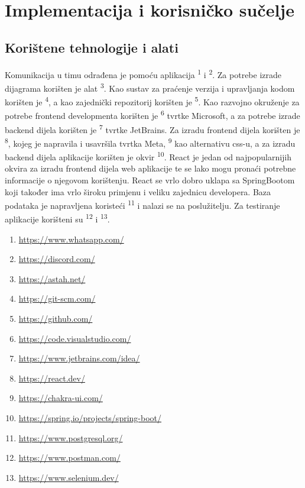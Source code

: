 \chapter{Implementacija i korisničko sučelje}


\section{Korištene tehnologije i alati}

Komunikacija u timu odrađena je pomoću aplikacija \textsuperscript{1} i \textsuperscript{2}. Za potrebe izrade dijagrama korišten je alat \textsuperscript{3}. Kao sustav za praćenje verzija i upravljanja kodom korišten je \textsuperscript{4}, a kao zajednički repozitorij korišten je \textsuperscript{5}.
Kao razvojno okruženje za potrebe frontend developmenta korišten je \textsuperscript{6} tvrtke Microsoft, a za potrebe izrade backend dijela korišten je \textsuperscript{7} tvrtke JetBrains. \newline
Za izradu frontend dijela korišten je \textsuperscript{8}, kojeg je napravila i usavršila tvrtka Meta, \textsuperscript{9} kao alternativu css-u, a za izradu backend dijela aplikacije korišten je okvir \textsuperscript{10}.
React je jedan od najpopularnijih okvira za izradu frontend dijela web aplikacije te se lako mogu pronaći potrebne informacije o njegovom korištenju. React se vrlo dobro uklapa sa SpringBootom koji također ima vrlo široku primjenu i veliku zajednicu developera.
Baza podataka je napravljena koristeći \textsuperscript{11} i nalazi se na poslužitelju.
Za testiranje aplikacije korišteni su \textsuperscript{12} i \textsuperscript{13}.\\

\footnotesize \begin{enumerate}
	\itemsep0em
	\item \url{https://www.whatsapp.com/}
	\item \url{https://discord.com/}
	\item \url{https://astah.net/}
	\item \url{https://git-scm.com/}
	\item \url{https://github.com/}
	\item \url{https://code.visualstudio.com/}
	\item \url{https://www.jetbrains.com/idea/}
	\item \url{https://react.dev/}
	\item \url{https://chakra-ui.com/}
	\item \url{https://spring.io/projects/spring-boot/}
	\item \url{https://www.postgresql.org/}
	\item \url{https://www.postman.com/}
	\item \url{https://www.selenium.dev/}
\end{enumerate}

